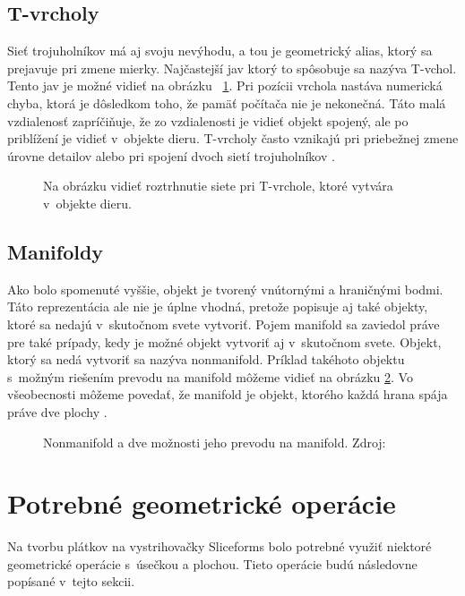 \subsection{T-vrcholy} \label{Sec:TVrchol}
Sieť trojuholníkov má aj svoju nevýhodu, a tou je geometrický alias, ktorý sa prejavuje pri zmene mierky. Najčastejší jav ktorý to spôsobuje sa nazýva T-vchol. Tento jav je možné vidieť na obrázku ~\ref{fig:TVrchol}. 
Pri pozícii vrchola nastáva numerická chyba, ktorá je dôsledkom toho, že pamäť počítača nie je nekonečná. Táto malá vzdialenosť zapríčiňuje, že zo vzdialenosti je vidieť objekt spojený, ale po priblížení je vidieť v~objekte dieru.
T-vrcholy často vznikajú pri priebežnej zmene úrovne detailov alebo pri spojení dvoch sietí trojuholníkov \cite{modernipocitacovagrafika}.

\begin{figure}[!h]
\centering
{}
\caption{Na obrázku vidieť roztrhnutie siete pri T-vrchole, ktoré vytvára v~objekte dieru.}
\label{fig:TVrchol}
\end{figure}


\subsection{Manifoldy}
Ako bolo spomenuté vyššie, objekt je tvorený vnútornými a hraničnými bodmi. Táto reprezentácia ale nie je úplne vhodná, pretože popisuje aj také objekty, ktoré sa nedajú v~skutočnom svete vytvoriť.
Pojem manifold sa zaviedol práve pre také prípady, kedy je možné objekt vytvoriť aj v~skutočnom svete. Objekt, ktorý sa nedá vytvoriť sa nazýva nonmanifold. Príklad takéhoto objektu s~možným riešením prevodu na manifold môžeme vidieť na obrázku \ref{fig:nonmanifold}. Vo všeobecnosti môžeme povedať, že manifold je objekt, ktorého každá hrana spája práve dve plochy \cite{modernipocitacovagrafika}.

\begin{figure}[!h]
\centering
{}
\caption{Nonmanifold a dve možnosti jeho prevodu na manifold.  Zdroj:~\protect\cite{modernipocitacovagrafika}}
\label{fig:nonmanifold}
\end{figure}
\section{Potrebné geometrické operácie}
Na tvorbu plátkov na vystrihovačky Sliceforms bolo potrebné využiť niektoré geometrické operácie s~úsečkou a plochou. Tieto operácie budú následovne popísané v~tejto sekcii.

